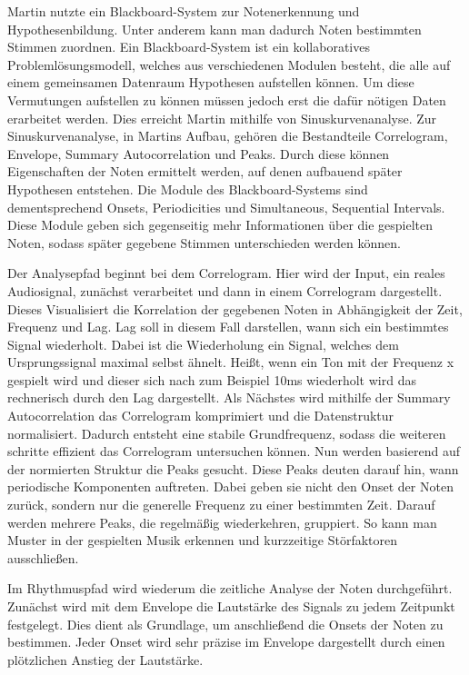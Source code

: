 Martin nutzte ein Blackboard-System zur Notenerkennung und Hypothesenbildung.
Unter anderem kann man dadurch Noten bestimmten Stimmen zuordnen.
Ein Blackboard-System ist ein kollaboratives Problemlösungsmodell, welches aus verschiedenen Modulen besteht,
die alle auf einem gemeinsamen Datenraum Hypothesen aufstellen können.
Um diese Vermutungen aufstellen zu können müssen jedoch erst die dafür nötigen Daten erarbeitet werden.
Dies erreicht Martin mithilfe von Sinuskurvenanalyse.
Zur Sinuskurvenanalyse, in Martins Aufbau, gehören die Bestandteile
Correlogram, Envelope, Summary Autocorrelation und Peaks.
Durch diese können Eigenschaften der Noten ermittelt werden, auf denen aufbauend später Hypothesen entstehen.
Die Module des Blackboard-Systems sind dementsprechend
Onsets, Periodicities und Simultaneous, Sequential Intervals.
Diese Module geben sich gegenseitig mehr Informationen über die gespielten Noten,
sodass später gegebene Stimmen unterschieden werden können.

Der Analysepfad beginnt bei dem Correlogram.
Hier wird der Input, ein reales Audiosignal,
zunächst verarbeitet und dann in einem Correlogram dargestellt.
Dieses Visualisiert die Korrelation der gegebenen Noten in Abhängigkeit der Zeit, Frequenz und Lag.
Lag soll in diesem Fall darstellen, wann sich ein bestimmtes Signal wiederholt.
Dabei ist die Wiederholung ein Signal, welches dem Ursprungssignal maximal selbst ähnelt.
Heißt, wenn ein Ton mit der Frequenz x gespielt wird
und dieser sich nach zum Beispiel 10ms wiederholt wird das rechnerisch durch den Lag dargestellt.
Als Nächstes wird mithilfe der Summary Autocorrelation das Correlogram komprimiert
und die Datenstruktur normalisiert.
Dadurch entsteht eine stabile Grundfrequenz,
sodass die weiteren schritte effizient das Correlogram untersuchen können.
Nun werden basierend auf der normierten Struktur die Peaks gesucht.
Diese Peaks deuten darauf hin, wann periodische Komponenten auftreten.
Dabei geben sie nicht den Onset der Noten zurück, sondern nur die generelle Frequenz zu einer bestimmten Zeit.
Darauf werden mehrere Peaks, die regelmäßig wiederkehren, gruppiert.
So kann man Muster in der gespielten Musik erkennen und kurzzeitige Störfaktoren ausschließen.

Im Rhythmuspfad wird wiederum die zeitliche Analyse der Noten durchgeführt.
Zunächst wird mit dem Envelope die Lautstärke des Signals zu jedem Zeitpunkt festgelegt.
Dies dient als Grundlage, um anschließend die Onsets der Noten zu bestimmen.
Jeder Onset wird sehr präzise im Envelope dargestellt durch einen plötzlichen Anstieg der Lautstärke.

